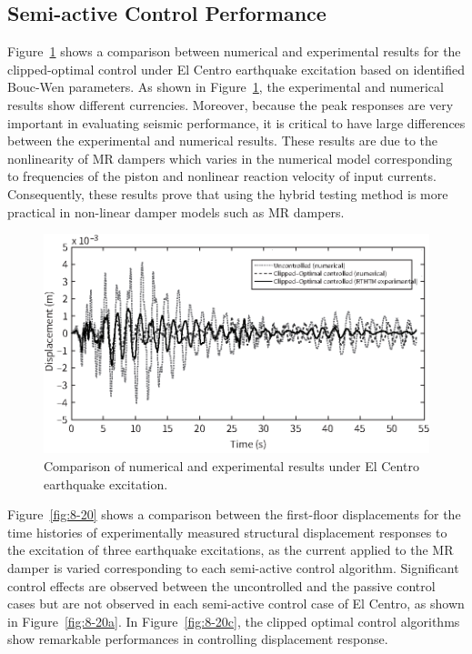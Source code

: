 \subsection{Semi-active Control Performance}
Figure~\ref{fig:8-19} shows a comparison between numerical and experimental results for the clipped-optimal control under El Centro earthquake excitation based on identified Bouc-Wen parameters. As shown in Figure~\ref{fig:8-19}, the experimental and numerical results show different currencies. Moreover, because the peak responses are very important in evaluating seismic performance, it is critical to have large differences between the experimental and numerical results. These results are due to the nonlinearity of MR dampers which varies in the numerical model corresponding to frequencies of the piston and nonlinear reaction velocity of input currents. Consequently, these results prove that using the hybrid testing method is more practical in non-linear damper models such as MR dampers.

\begin{figure}[H]
\centering
\includegraphics[width=1\textwidth] {figure/8-19.eps}
\caption{Comparison of numerical and experimental results under El Centro earthquake excitation.}
\label{fig:8-19}
\end{figure}

Figure~\ref{fig:8-20} shows a comparison between the first-floor displacements for the time histories of experimentally measured structural displacement responses to the excitation of three earthquake excitations, as the current applied to the MR damper is varied corresponding to each semi-active control algorithm. Significant control effects are observed between the uncontrolled and the passive control cases but are not observed in each semi-active control case of El Centro, as shown in Figure~\ref{fig:8-20a}. In Figure~\ref{fig:8-20c}, the clipped optimal control algorithms show remarkable performances in controlling displacement response.

